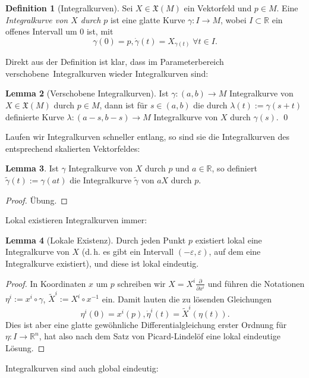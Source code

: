 \documentclass[a4paper]{scrbook}
\numberwithin{equation}{chapter}
\newcommand{\R}{\mathbb{R}}
\theoremstyle{definition}
\newtheorem{defn}{Definition}[section]
\newtheorem{lemma}[defn]{Lemma}
\newcommand{\bewUeb}{\begin{proof}Übung.\end{proof}}
\begin{document}
\begin{defn}[Integralkurven]
	Sei $X \in \mathfrak X(M)$ ein Vektorfeld und $p\in M$. Eine \emph{Integralkurve von $X$ durch $p$} ist eine glatte Kurve $\gamma\colon I \to M$, wobei $I \subset \R$ ein offenes Intervall um 0 ist, mit \[\gamma(0) = p, \dot\gamma(t) = X_{\gamma(t)} \; \forall t \in I.\]
\end{defn}
Direkt aus der Definition ist klar, dass im Parameterbereich \glqq verschobene\grqq\ Integralkurven wieder Integralkurven sind:
\begin{lemma}[Verschobene Integralkurven] \label{lemma:int_kurv_versch}
	Ist $\gamma\colon (a,b) \to M$ Integralkurve von $X\in\mathfrak X(M)$ durch $p\in M$, dann ist für $s \in (a,b)$ die durch $\lambda(t) := \gamma(s + t)$ definierte Kurve $\lambda\colon (a-s,b-s) \to M$ Integralkurve von $X$ durch $\gamma(s)$. \qed
\end{lemma}
Laufen wir Integralkurven schneller entlang, so sind sie die Integralkurven des entsprechend skalierten Vektorfeldes:
\begin{lemma}
	Ist $\gamma$ Integralkurve von $X$ durch $p$ und $a\in\R$, so definiert $\tilde\gamma(t) := \gamma(at)$ die Integralkurve $\tilde\gamma$ von $aX$ durch $p$. \bewUeb
\end{lemma}
Lokal existieren Integralkurven immer:
\begin{lemma}[Lokale Existenz]
	Durch jeden Punkt $p$ existiert lokal eine Integralkurve von $X$ (d.\,h. es gibt ein Intervall $(-\varepsilon,\varepsilon)$, auf dem eine Integralkurve existiert), und diese ist lokal eindeutig.

	\begin{proof}
		In Koordinaten $x$ um $p$ schreiben wir $X = X^i \frac{\partial}{\partial x^i}$ und führen die Notationen $\eta^i := x^i \circ \gamma$, $\tilde X^i := X^i \circ x^{-1}$ ein. Damit lauten die zu lösenden Gleichungen
		\[\eta^i(0) = x^i(p), \dot \eta^i(t) = \tilde X^i(\eta(t)).\]
		Dies ist aber eine glatte gewöhnliche Differentialgleichung erster Ordnung für $\eta\colon I \to \R^n$, hat also nach dem Satz von Picard-Lindelöf eine lokal eindeutige Lösung.
	\end{proof}
\end{lemma}
Integralkurven sind auch global eindeutig:
\end{document}
